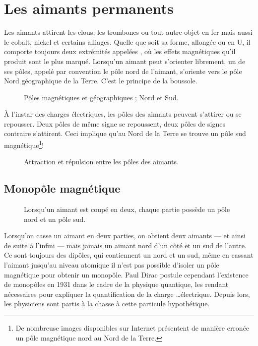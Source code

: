\newpage

\section{Les aimants permanents}
Les aimants attirent les clous, les trombones ou tout autre objet en fer mais aussi le cobalt, nickel et certains alliages. Quelle que soit sa forme, allongée ou en U, il comporte toujours deux extrémités appelées , où les effets magnétiques qu'il produit sont le plus marqué. Lorsqu'un aimant peut s'orienter librement, un de ses pôles, appelé par convention le pôle nord de l'aimant, s'oriente vers le pôle Nord géographique de la Terre. C'est le principe de la boussole.
\begin{figure}[h!]
    \centering
    {}
    \caption{Pôles magnétiques et géographiques ; Nord et Sud.}
    \label{champ_magnetique_terre}
\end{figure}

\newpage
À l'instar des charges électriques, les pôles des aimants peuvent s'attirer ou se repousser. Deux pôles de même signe se repoussent, deux pôles de signes contraire s'attirent. Ceci implique qu'au Nord de la Terre se trouve un pôle sud magnétique\footnote{De nombreuse images disponibles sur Internet présentent de manière erronée un pôle magnétique nord au Nord de la Terre.}!


\begin{figure}[h!]
    \centering
    \resizebox{.7\linewidth}{!}
    {}
    \caption{Attraction et répulsion entre les pôles des aimants.}
    \label{ar_aimants_droits}
\end{figure}

\newpage

\subsection{Monopôle magnétique}
\begin{figure}
    \vspace{-\baselineskip}
    
    \caption{Lorsqu'un aimant est coupé en deux, chaque partie possède un pôle nord et un pôle sud.}
    \label{monopole}
\end{figure}

Lorsqu'on casse un aimant en deux parties, on obtient deux aimants --- et ainsi de suite à l'infini --- mais jamais un aimant nord d'un côté et un sud de l'autre. Ce sont toujours des dipôles, qui contiennent un nord et un sud, même en cassant l'aimant jusqu'au niveau atomique il n'est pas possible d'isoler un pôle magnétique pour obtenir un monopôle.
Paul Dirac postule cependant l'existence de monopôles en 1931 dans le cadre de la physique quantique, les rendant nécessaires pour expliquer la quantification de la charge \ldots électrique. Depuis lors, les physiciens sont partis à la chasse à cette particule hypothétique.


